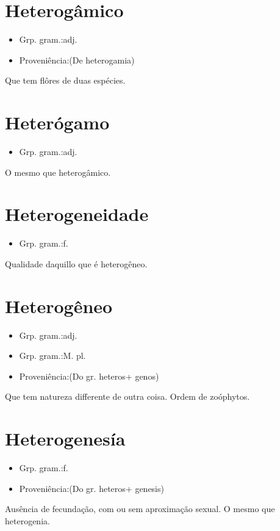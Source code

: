 \documentclass{article}
\begin{document}
\section{Heterogâmico}
\begin{itemize}
\item {Grp. gram.:adj.}
\end{itemize}
\begin{itemize}
\item {Proveniência:(De \textunderscore heterogamia\textunderscore )}
\end{itemize}
Que tem flôres de duas espécies.
\section{Heterógamo}
\begin{itemize}
\item {Grp. gram.:adj.}
\end{itemize}
O mesmo que \textunderscore heterogâmico\textunderscore .
\section{Heterogeneidade}
\begin{itemize}
\item {Grp. gram.:f.}
\end{itemize}
Qualidade daquillo que é heterogêneo.
\section{Heterogêneo}
\begin{itemize}
\item {Grp. gram.:adj.}
\end{itemize}
\begin{itemize}
\item {Grp. gram.:M. pl.}
\end{itemize}
\begin{itemize}
\item {Proveniência:(Do gr. \textunderscore heteros\textunderscore  + \textunderscore genos\textunderscore )}
\end{itemize}
Que tem natureza differente de outra coisa.
Ordem de zoóphytos.
\section{Heterogenesía}
\begin{itemize}
\item {Grp. gram.:f.}
\end{itemize}
\begin{itemize}
\item {Proveniência:(Do gr. \textunderscore heteros\textunderscore  + \textunderscore genesis\textunderscore )}
\end{itemize}
Ausência de fecundação, com ou sem aproximação sexual.
O mesmo que \textunderscore heterogenia\textunderscore .
\end{document}
